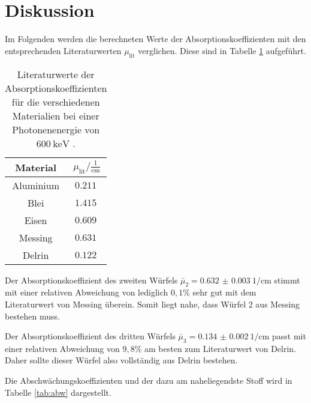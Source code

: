 \section{Diskussion}
\label{sec:Diskussion}

Im Folgenden werden die berechneten Werte der Absorptionskoeffizienten mit den
entsprechenden Literaturwerten $\mu_{\mathrm{lit}}$ verglichen. Diese sind in Tabelle \ref{tab:literatur}
aufgeführt.

\begin{table}[H]
  \centering
  \caption{Literaturwerte der Absorptionskoeffizienten für die verschiedenen Materialien bei einer
  Photonenenergie von $\SI{600}{\kilo\eV}$ \cite{sample2}.}
  \label{tab:literatur}
  \begin{tabular}{c c}
    \toprule
    Material &  $\mu_{\mathrm{lit}} / \frac{1}{\mathrm{cm}}$  \\
    \midrule
        Aluminium    & $\SI{0.211}{}$ \\
        Blei    & $\SI{1.415}{}$ \\
        Eisen & $\SI{0.609}{}$ \\
        Messing    & $\SI{0.631}{}$ \\
        Delrin & $\SI{0.122}{}$ \\
    \bottomrule
  \end{tabular}
\end{table}

Der Absorptionskoeffizient des zweiten Würfels $\bar\mu_2 = \SI{0.632(3)}{1\per\centi\meter}$
stimmt mit einer relativen Abweichung von lediglich $0,1$\% sehr gut mit dem Literaturwert
von Messing überein. Somit liegt nahe, dass Würfel 2 aus Messing bestehen muss.

Der Absorptionskoeffizient des dritten Würfels $\bar\mu_3 = \SI{0.134(2)}{1\per\centi\meter}$
passt mit einer relativen Abweichung von $9,8$\% am besten zum Literaturwert von
Delrin. Daher sollte dieser Würfel also vollständig aus Delrin bestehen.



Die Abschwächungskoeffizienten und der dazu am naheliegendste Stoff wird in
Tabelle \ref{tab:abw} dargestellt.

